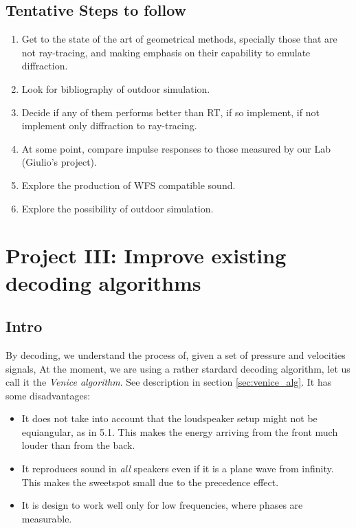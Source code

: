 \documentclass[12pt]{article}
\begin{document}
\subsection{Tentative Steps to follow}

\begin{enumerate}

\item Get to the state of the art of geometrical methods, specially those
that are not ray-tracing, and making emphasis on their capability to
emulate diffraction.

\item Look for bibliography of outdoor simulation.

\item Decide if any of them performs better than RT, if so implement, if not
implement only diffraction to ray-tracing.

\item At some point, compare impulse responses to those measured by our Lab
(Giulio's project).

\item Explore the production of WFS compatible sound.

\item Explore the possibility of outdoor simulation.


\end{enumerate}

\section{Project III: Improve existing decoding algorithms}

\subsection{Intro}

By decoding, we understand the process of, given a set of 
pressure and velocities signals, 
At the moment, we are using a rather stardard decoding algorithm,
let us call it the {\it Venice algorithm}. See description in section
\ref{sec:venice_alg}.
It has some disadvantages:
\begin{itemize}
\item It does not take into account that the loudspeaker setup
might not be equiangular, as in 5.1. This makes the energy arriving
from the front much louder than from the back.
\item It reproduces sound in {\it all} speakers even if it is
a plane wave from infinity. This makes the sweetspot small
due to the precedence effect.
\item It is design to work well only for low frequencies, where phases
are measurable.
\end{itemize}
\end{document}
